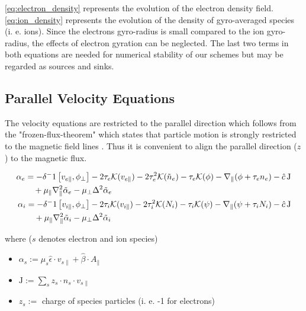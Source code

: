 \autoref{eq:electron_density} represents the evolution of the electron density field.
\autoref{eq:ion_density} represents the evolution of the density of gyro-averaged species (i. e. ions). Since the electrons gyro-radius is small compared to the ion gyro-radius, the effects of electron gyration can be neglected. \newline
The last two terms in both equations are needed for numerical stability of our schemes but may be regarded as sources and sinks. 


\subsection{Parallel Velocity Equations}
The velocity equations are restricted to the parallel direction which follows from the "frozen-flux-theorem" which states that particle motion is strongly restricted to the magnetic field lines . Thus it is convenient to align the parallel direction ($z$) to the magnetic flux.


\begin{align}
\begin{split}
    \alpha_e &=  -\delta^-1 \left[v_{e\parallel}, \phi_\perp\right]
    - 2\tau_e \mathcal{K}( v_{e\parallel})
    - 2\tau_e^2 \mathcal{K}(\Tilde{n}_e)
    - \tau_e \mathcal{K}( \phi)
    - \nabla_\parallel (\phi + \tau_e n_e)
    - \hat{c}\, \mathrm{J}\\
    & \quad + \mu_\parallel \nabla_\parallel^2\Tilde{\alpha}_e 
    - \mu_\perp \Delta^2\Tilde{\alpha}_e \label{eq:electron_velocity}
\end{split}\\
\begin{split}
    \alpha_i &= -\delta^-1  \left[v_{i\parallel}, \phi_\perp\right]
    - 2\tau_i \mathcal{K}(v_{i\parallel})
    - 2\tau_i^2 \mathcal{K}(N_i)
    - \tau_i \mathcal{K}(\psi)
    - \nabla_\parallel (\psi + \tau_i N_i)
    - \hat{c}\, \mathrm{J}\\
    &\quad + \mu_\parallel\nabla_\parallel^2\Tilde{\alpha}_i 
    - \mu_\perp \Delta^2\Tilde{\alpha}_i \label{eq:ion_velocity}
\end{split}
\end{align}

where ($s$ denotes electron and ion species)

\begin{itemize}
    \item $\alpha_s := \mu_s \hat{\epsilon} \cdot v_{s\parallel} + \hat{\beta} \cdot A_{\parallel}$
    \item $\mathrm{J} := \sum_s z_s \cdot n_s \cdot v_{s\parallel}$
    \item $z_s :=$ charge of species particles (i. e. -1 for electrons)
\end{itemize}

